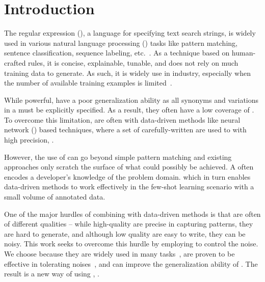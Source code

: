\section{Introduction}


The regular expression (\RE), a language for specifying text search strings, is widely used in various natural language processing (\NLP)
tasks like pattern matching, sentence classification, sequence labeling, etc.~\cite{chang2014tokensregex}.
As a technique based on human-crafted rules, it is concise, explainable, tunable, and does not rely on much training data to generate. As
such, it is widely use in industry, especially when the number of available training examples is limited~\cite{gc2015big}.

While powerful, \REs have a poor generalization ability as all synonyms and variations in a \RE must be explicitly specified. As a result,
they often have a low coverage of . To overcome this limitation, \REs are often  with data-driven methods like neural network
(\NN) based techniques, where a set of carefully-written \REs are used to
with high precision, .

However, the use of \REs can go beyond simple pattern matching and existing approaches only scratch the surface of what could possibly be
achieved. A \RE often encodes a developer's knowledge of the problem domain.
which in turn enables data-driven methods to work effectively in the few-shot learning scenario with a small volume of
annotated data.



One of the major hurdles of combining \REs with data-driven methods is that \REs are often of different qualities -- while high-quality
\REs are precise in capturing patterns, they are hard to generate, and although low quality \REs are easy to write, they can be noisy. This
work seeks to overcome this hurdle by employing \NNs to control the noise. We choose \NNs because they are widely used in many \NLP
tasks~\cite{goldberg2017neural}, are proven to be effective in tolerating noises~\cite{xie2016disturblabel}, and can improve the
generalization ability of \REs. The result is a new way of using \REs,  .

